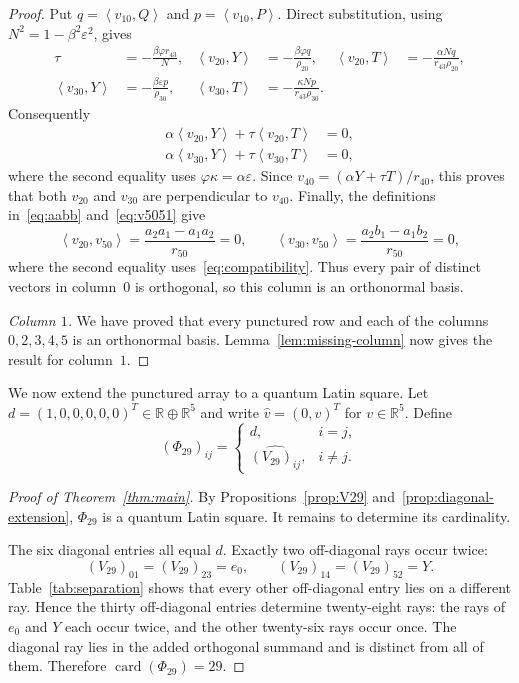 \documentclass[11pt]{article}
\theoremstyle{definition}
\newcommand{\R}{\mathbb R}
\newcommand{\card}{\operatorname{card}}
\newcommand{\ip}[2]{\left\langle #1,#2\right\rangle}
\begin{document}
\begin{proof}
Put $q=\ip{v_{10}}{Q}$ and $p=\ip{v_{10}}{P}$.  Direct substitution, using
$N^2=1-\beta^2\varepsilon^2$, gives
\begin{align*}
\tau&=-\frac{\beta\varphi r_{43}}{N},&
\ip{v_{20}}{Y}&=-\frac{\beta\varphi q}{\rho_{20}},&
\ip{v_{20}}{T}&=-\frac{\alpha Nq}{r_{43}\rho_{20}},\\
\ip{v_{30}}{Y}&=-\frac{\beta\varepsilon p}{\rho_{30}},&
\ip{v_{30}}{T}&=-\frac{\kappa Np}{r_{43}\rho_{30}}.
\end{align*}
Consequently
\begin{align*}
\alpha\ip{v_{20}}{Y}+\tau\ip{v_{20}}{T}&=0,\\
\alpha\ip{v_{30}}{Y}+\tau\ip{v_{30}}{T}&=0,
\end{align*}
where the second equality uses $\varphi\kappa=\alpha\varepsilon$.  Since
$v_{40}=(\alpha Y+\tau T)/r_{40}$, this proves that both $v_{20}$ and
$v_{30}$ are perpendicular to $v_{40}$.  Finally, the definitions
in~\eqref{eq:aabb} and~\eqref{eq:v5051} give
\[
\ip{v_{20}}{v_{50}}=\frac{a_2a_1-a_1a_2}{r_{50}}=0,
\qquad
\ip{v_{30}}{v_{50}}=\frac{a_2b_1-a_1b_2}{r_{50}}=0,
\]
where the second equality uses~\eqref{eq:compatibility}.  Thus every pair of
distinct vectors in column~$0$ is orthogonal, so this column is an
orthonormal basis.

\emph{Column $1$.}
We have proved that every punctured row and each of the columns
$0,2,3,4,5$ is an orthonormal basis.  Lemma~\ref{lem:missing-column} now gives
the result for column~$1$.
\end{proof}

We now extend the punctured array to a quantum Latin square.  Let
$d=(1,0,0,0,0,0)^T\in\R\oplus\R^5$ and write
$\widehat v=(0,v)^T$ for $v\in\R^5$.  Define
\begin{equation}\label{eq:Phi29}
(\Phi_{29})_{ij}=\begin{cases}
d,&i=j,\\
\widehat{(V_{29})_{ij}},&i\ne j.
\end{cases}
\end{equation}

\begin{proof}[Proof of Theorem~\ref{thm:main}]
By Propositions~\ref{prop:V29} and~\ref{prop:diagonal-extension},
$\Phi_{29}$ is a quantum Latin square.  It remains to determine its
cardinality.

The six diagonal entries all equal $d$.  Exactly two off-diagonal rays occur
twice:
\[
(V_{29})_{01}=(V_{29})_{23}=e_0,
\qquad
(V_{29})_{14}=(V_{29})_{52}=Y.
\]
Table~\ref{tab:separation} shows that every other off-diagonal entry lies on a
different ray.  Hence the thirty off-diagonal entries determine twenty-eight
rays: the rays of $e_0$ and $Y$ each occur twice, and the other twenty-six
rays occur once.  The diagonal ray lies in the added orthogonal summand and
is distinct from all of them.  Therefore $\card(\Phi_{29})=29$.
\end{proof}
\end{document}

